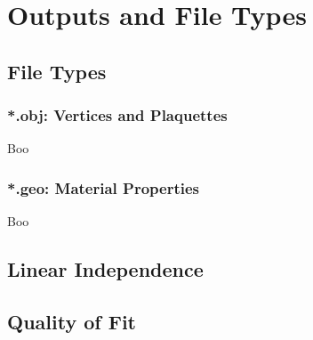 % 

\section{Outputs and File Types}

\subsection{File Types}
\begin{frame}\frametitle{*.obj: Vertices and Plaquettes}
Boo
\end{frame}
\begin{frame}\frametitle{*.geo: Material Properties}
Boo
\end{frame}


\subsection{Linear Independence}
	
\subsection{Quality of Fit}

\endinput  %
